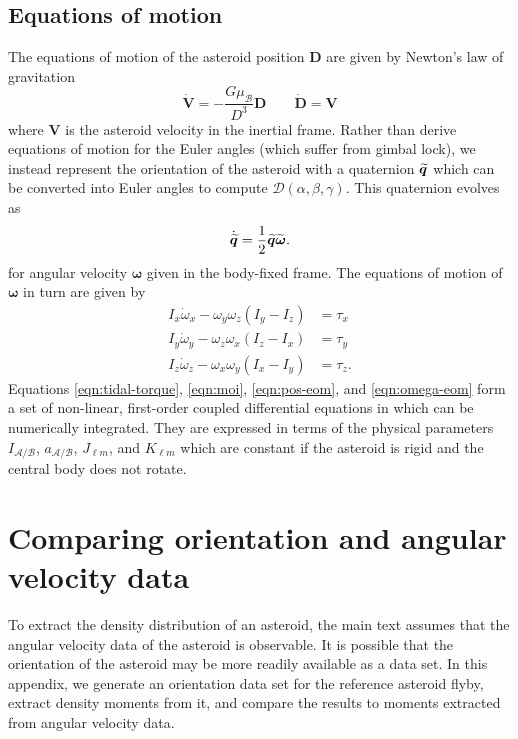 \subsection{Equations of motion}
\label{sec:eom}


The equations of motion of the asteroid position $\bm D$ are given by Newton's law of gravitation
\begin{equation}
  \dot{\bm V} = -\frac{G \mu_\mathcal{B}}{D^3} \bm D \qquad \dot{\bm D} = \bm V
  \label{eqn:pos-eom}
\end{equation}
where $\bm V$ is the asteroid velocity in the inertial frame. Rather than derive equations of motion for the Euler angles (which suffer from gimbal lock), we instead represent the orientation of the asteroid with a quaternion $\widetilde{\bm{q}}$ which can be converted into Euler angles to compute $\mathcal{D}(\alpha, \beta, \gamma)$. This quaternion evolves as 
\begin{equation}
  \dot{\widetilde{\bm{q}}} = \frac{1}{2}\widetilde{\bm{q}}\widetilde{\bm{\omega}}.
  \label{eqn:quat-eom}
\end{equation}
for angular velocity $\bm \omega$ given in the body-fixed frame. The equations of motion of $\bm \omega$ in turn are given by
\begin{equation}
  \begin{split}
    I_x \dot \omega_x - \omega_y \omega_z (I_y - I_z) &= \tau_x\\
    I_y \dot \omega_y - \omega_z \omega_x (I_z - I_x) &= \tau_y\\
    I_z \dot \omega_z - \omega_x \omega_y (I_x - I_y) &= \tau_z.
  \end{split}
  \label{eqn:omega-eom}
\end{equation}
Equations \ref{eqn:tidal-torque}, \ref{eqn:moi}, \ref{eqn:pos-eom}, and \ref{eqn:omega-eom} form a set of non-linear, first-order coupled differential equations in which can be numerically integrated. They are expressed in terms of the physical parameters $I_\mathcal{A/B}$, $a_\mathcal{A/B}$, $J_{\ell m}$, and $K_{\ell m}$ which are constant if the asteroid is rigid and the central body does not rotate.






\section{Comparing orientation and angular velocity data}
\label{app:orientation}

To extract the density distribution of an asteroid, the main text assumes that the angular velocity data of the asteroid is observable. It is possible that the orientation of the asteroid may be more readily available as a data set. In this appendix, we generate an orientation data set for the reference asteroid flyby, extract density moments from it, and compare the results to moments extracted from angular velocity data.

